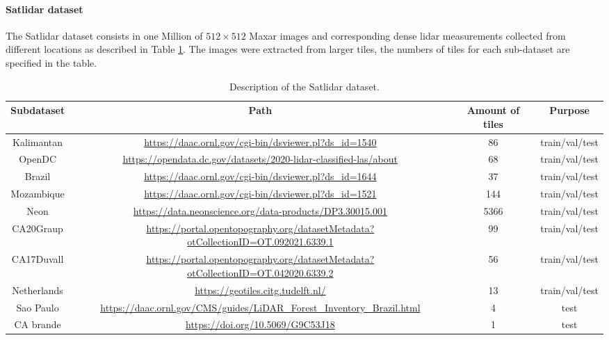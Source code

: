 \paragraph{Satlidar dataset}

The Satlidar dataset consists in one Million of $512\times 512$ Maxar images and corresponding dense lidar measurements collected from different locations as described in Table \cref{tab:satlidar}.
The images were extracted from larger tiles, the numbers of tiles for each sub-dataset are specified in the table.       
\begin{table}[tb]
    \centering
    \caption{Description of the Satlidar dataset.}
    \label{tab:satlidar}
    \begin{tabular}{cccc}
    \toprule
    Subdataset & Path & Amount of tiles & Purpose \\  
    \midrule
Kalimantan &\tiny{\url{https://daac.ornl.gov/cgi-bin/dsviewer.pl?ds_id=1540}}&86&	train/val/test\\
OpenDC	& \tiny{\url{https://opendata.dc.gov/datasets/2020-lidar-classified-las/about}}&68&	train/val/test\\
Brazil	&	\tiny{\url{https://daac.ornl.gov/cgi-bin/dsviewer.pl?ds_id=1644}}&37&	train/val/test\\
Mozambique	&	\tiny{\url{https://daac.ornl.gov/cgi-bin/dsviewer.pl?ds_id=1521}}&144&	train/val/test\\
Neon		&	\tiny{\url{https://data.neonscience.org/data-products/DP3.30015.001}} &5366&train/val/test\\
CA20Graup	&	\tiny{\url{https://portal.opentopography.org/datasetMetadata?otCollectionID=OT.092021.6339.1}}&99&	train/val/test\\
CA17Duvall &	\tiny{\url{https://portal.opentopography.org/datasetMetadata?otCollectionID=OT.042020.6339.2}}&56&	train/val/test\\
Netherlands	&	\tiny{\url{https://geotiles.citg.tudelft.nl/}}&13& train/val/test\\
Sao Paulo	& \tiny{\url{https://daac.ornl.gov/CMS/guides/LiDAR\_Forest\_Inventory\_Brazil.html}} &4&	test \\
CA brande	& \tiny{\url{https://doi.org/10.5069/G9C53J18}} &1& test\\
\bottomrule
    \end{tabular}
\end{table}%
